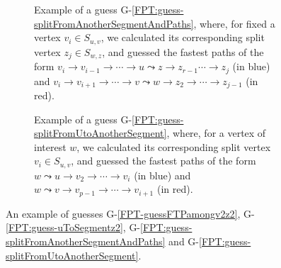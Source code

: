 \documentclass[a4paper,UKenglish,cleveref, autoref, thm-restate, anonymous]{lipics-v2021}
\begin{document}
\begin{figure}[t]
	\begin{subfigure}[b]{0.48\textwidth}
			\centering
			\caption{Example of a guess G-\ref{FPT:guess-splitFromAnotherSegmentAndPaths}, where, for fixed a vertex $v_i \in S_{u,v}$,
				we calculated its corresponding split vertex $z_j \in S_{w,z}$,
				and guessed the fastest paths of the form
				$v_i \rightarrow v_{i-1} \rightarrow \cdots \rightarrow u \leadsto z \rightarrow z_{r-1} \cdots \rightarrow z_j$ (in blue) 
				and $v_i \rightarrow v_{i+1} \rightarrow \cdots \rightarrow v \leadsto w \rightarrow z_2 \rightarrow \cdots \rightarrow z_{j-1}$ (in red). 
				\label{fig:FPT-guessG6}}
		\end{subfigure}
	\quad
	\begin{subfigure}[b]{0.48\textwidth}
		\centering
	\caption{Example of a guess G-\ref{FPT:guess-splitFromUtoAnotherSegment}, where, for a vertex of interest $w$, 
		we
		calculated its corresponding split vertex $v_i \in S_{u,v}$,
		and guessed the fastest paths of the form
		$w \leadsto u \rightarrow v_2 \rightarrow \cdots \rightarrow v_i$  (in blue) 
		and $w \leadsto v \rightarrow v_{p-1} \rightarrow \cdots \rightarrow v_{i+1}$ (in red). 
		\label{fig:FPT-guessG7}}
	\end{subfigure}
\caption{An example of guesses G-\ref{FPT-guessFTPamongv2z2}, G-\ref{FPT:guess-uToSegmentz2}, G-\ref{FPT:guess-splitFromAnotherSegmentAndPaths} and G-\ref{FPT:guess-splitFromUtoAnotherSegment}.}
\end{figure}
\end{document}
